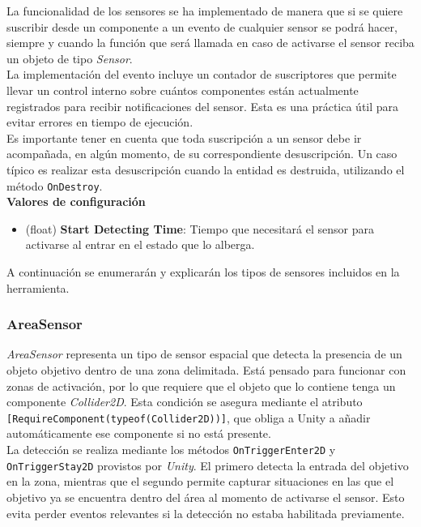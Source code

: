 La funcionalidad de los sensores se ha implementado de manera que si se quiere suscribir desde un componente a un evento de cualquier sensor se podrá hacer, siempre y cuando la función que será llamada en caso de activarse el sensor reciba un objeto de tipo \textit{Sensor}.\\

La implementación del evento incluye un contador de suscriptores que permite llevar un control interno sobre cuántos componentes están actualmente registrados para recibir notificaciones del sensor. Esta es una práctica útil para evitar errores en tiempo de ejecución.\\

Es importante tener en cuenta que toda suscripción a un sensor debe ir acompañada, en algún momento, de su correspondiente desuscripción. Un caso típico es realizar esta desuscripción cuando la entidad es destruida, utilizando el método \texttt{OnDestroy}.\\

\textbf{Valores de configuración}
\begin{itemize}
	\item (float) \textbf{Start Detecting Time}: Tiempo que necesitará el sensor para activarse al entrar en el estado que lo alberga.
\end{itemize}

A continuación se enumerarán y explicarán los tipos de sensores incluidos en la herramienta.\\

\subsubsection{AreaSensor}

\textit{AreaSensor} representa un tipo de sensor espacial que detecta la presencia de un objeto objetivo dentro de una zona delimitada. Está pensado para funcionar con zonas de activación, por lo que requiere que el objeto que lo contiene tenga un componente \textit{Collider2D}. Esta condición se asegura mediante el atributo \texttt{[RequireComponent(typeof(Collider2D))]}, que obliga a Unity a añadir automáticamente ese componente si no está presente.\\

La detección se realiza mediante los métodos \texttt{OnTriggerEnter2D} y \texttt{OnTriggerStay2D} provistos por \textit{Unity}. El primero detecta la entrada del objetivo en la zona, mientras que el segundo permite capturar situaciones en las que el objetivo ya se encuentra dentro del área al momento de activarse el sensor. Esto evita perder eventos relevantes si la detección no estaba habilitada previamente.\\


